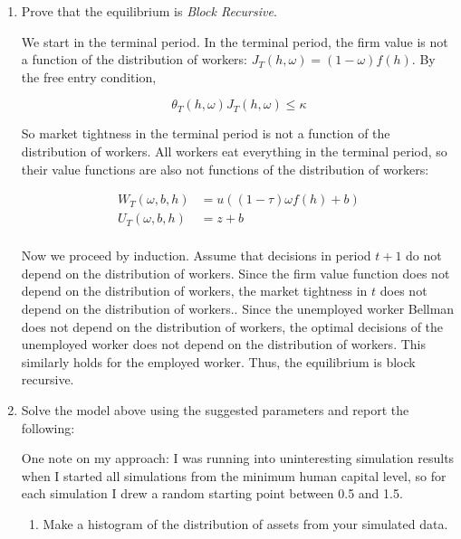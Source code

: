 \documentclass{article}
\begin{document}
\begin{enumerate}
\item Prove that the equilibrium is \textit{Block Recursive}.

We start in the terminal period. In the terminal period, the firm value is not a function of the distribution of workers: $J_T(h, \omega) = (1-\omega) f(h)$. By the free entry condition, 

$$
\theta_T(h, \omega) J_T(h, \omega) \le \kappa
$$

So market tightness in the terminal period is not a function of the distribution of workers.  All workers eat everything in the terminal period, so their value functions are also not functions of the distribution of workers:

\begin{align*}
W_T(\omega, b, h) &= u((1-\tau)\omega f(h) + b) \\
U_T(\omega, b, h) &= z + b \\
\end{align*}

Now we proceed by induction. Assume that decisions in period $t+1$ do not depend on the distribution of workers.  Since the firm value function does not depend on the distribution of workers, the market tightness in $t$ does not depend on the distribution of workers.. Since the unemployed worker Bellman does not depend on the distribution of workers, the optimal decisions of the unemployed worker does not depend on the distribution of workers.  This similarly holds for the employed worker.  Thus, the equilibrium is block recursive.

\item Solve the model above using the suggested parameters and report the following:

\bigskip

One note on my approach: I was running into uninteresting simulation results when I started all simulations from the minimum human capital level, so for each simulation I drew a random starting point between 0.5 and 1.5.

\bigskip

\begin{enumerate}

\item Make a histogram of the distribution of assets from your simulated data.


\end{enumerate}
\end{enumerate}
\end{document}
